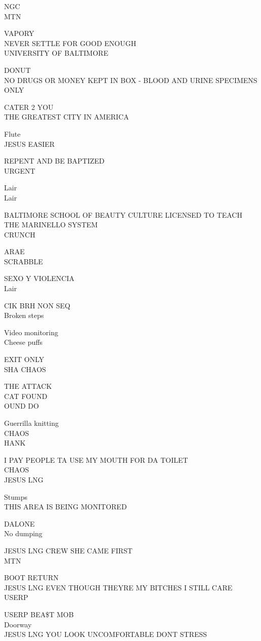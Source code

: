 \documentclass[10pt,letterpaper]{article}
\begin{document}
NGC\\
MTN

VAPORY\\
NEVER SETTLE FOR GOOD ENOUGH\\
UNIVERSITY OF BALTIMORE

DONUT\\
NO DRUGS OR MONEY KEPT IN BOX {-} BLOOD AND URINE SPECIMENS ONLY

CATER 2 YOU\\
THE GREATEST CITY IN AMERICA

Flute\\
JESUS EASIER

REPENT AND BE BAPTIZED\\
URGENT

Lair\\
Lair

BALTIMORE SCHOOL OF BEAUTY CULTURE LICENSED TO TEACH THE MARINELLO SYSTEM\\
CRUNCH

ARAE\\
SCRABBLE

SEXO Y VIOLENCIA\\
Lair

CIK BRH NON SEQ\\
Broken steps

Video monitoring\\
Cheese puffs

EXIT ONLY\\
SHA CHAOS

THE ATTACK\\
CAT FOUND\\
OUND DO

Guerrilla knitting\\
CHAOS\\
HANK

I PAY PEOPLE TA USE MY MOUTH FOR DA TOILET\\
CHAOS\\
JESUS LNG

Stumps\\
THIS AREA IS BEING MONITORED

DALONE\\
No dumping

JESUS LNG CREW SHE CAME FIRST\\
MTN

BOOT RETURN\\
JESUS LNG EVEN THOUGH THEYRE MY BITCHES I STILL CARE\\
USERP

USERP BEA\$T MOB\\
Doorway\\
JESUS LNG YOU LOOK UNCOMFORTABLE DONT STRESS
\end{document}
